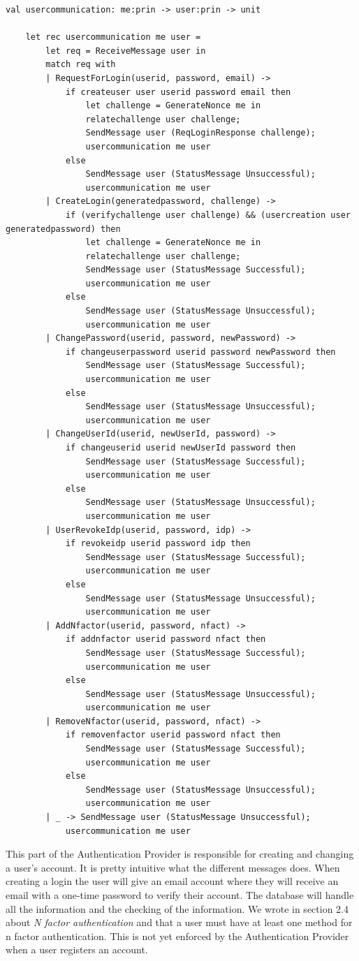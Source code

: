 \documentclass[twosided]{report}
\begin{document}
\begin{lstlisting}[style=fstar, caption={The creation and changing of a user's account}]
	val usercommunication: me:prin -> user:prin -> unit

	let rec usercommunication me user =
		let req = ReceiveMessage user in
		match req with
		| RequestForLogin(userid, password, email) -> 
			if createuser user userid password email then
				let challenge = GenerateNonce me in
				relatechallenge user challenge;
				SendMessage user (ReqLoginResponse challenge);
				usercommunication me user
			else
				SendMessage user (StatusMessage Unsuccessful);
				usercommunication me user
		| CreateLogin(generatedpassword, challenge) ->
			if (verifychallenge user challenge) && (usercreation user generatedpassword) then
				let challenge = GenerateNonce me in
				relatechallenge user challenge;
				SendMessage user (StatusMessage Successful);
				usercommunication me user
			else
				SendMessage user (StatusMessage Unsuccessful);
				usercommunication me user
		| ChangePassword(userid, password, newPassword) ->
			if changeuserpassword userid password newPassword then
				SendMessage user (StatusMessage Successful);
				usercommunication me user
			else
				SendMessage user (StatusMessage Unsuccessful);
				usercommunication me user
		| ChangeUserId(userid, newUserId, password) ->
			if changeuserid userid newUserId password then
				SendMessage user (StatusMessage Successful);
				usercommunication me user
			else
				SendMessage user (StatusMessage Unsuccessful);
				usercommunication me user
		| UserRevokeIdp(userid, password, idp) ->
			if revokeidp userid password idp then
				SendMessage user (StatusMessage Successful);
				usercommunication me user
			else
				SendMessage user (StatusMessage Unsuccessful);
				usercommunication me user
		| AddNfactor(userid, password, nfact) ->
			if addnfactor userid password nfact then
				SendMessage user (StatusMessage Successful);
				usercommunication me user
			else
				SendMessage user (StatusMessage Unsuccessful);
				usercommunication me user
		| RemoveNfactor(userid, password, nfact) ->
			if removenfactor userid password nfact then
				SendMessage user (StatusMessage Successful);
				usercommunication me user
			else
				SendMessage user (StatusMessage Unsuccessful);
				usercommunication me user
		| _ -> SendMessage user (StatusMessage Unsuccessful);
			usercommunication me user
\end{lstlisting}
This part of the Authentication Provider is responsible for creating and changing a user's account. It is pretty intuitive what the different messages does. When creating a login the user will give an email account where they will receive an email with a one-time password to verify their account. The database will handle all the information and the checking of the information. We wrote in section 2.4 about \emph{N factor authentication} and that a user must have at least one method for n factor authentication. This is not yet enforced by the Authentication Provider when a user registers an account.
\end{document}
